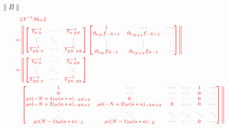 \documentclass[11pt,a4paper,titlepage]{jsreport}
\theoremstyle{definition}
\providecommand{\DIFdel}[1]{{\protect\color{red} \scriptsize #1}} %
\begin{document}
\begin{enumerate}
\item[\DIFdel{$\|B\|$}]%
\begin{displaymath}
  \DIFdel{\begin{split}
    &\|T^{-1}M_{01}\| \\
    =& \left \| \begin{bmatrix}
      T^{-1}_{0\ 0} & \cdots & T^{-1}_{0\ 2N} \\
      \vdots & \ddots & \vdots \\
      T^{-1}_{2N\ 0} & \cdots & T^{-1}_{2N\ 2N} \\
    \end{bmatrix}
    \begin{bmatrix}
      1 & \cdots & \cdots \\
      \partial_{a_N} f_{-N+1} & \partial_{a_{N+1}} f_{-N+1}  & \cdots \\
      \vdots & \vdots & \vdots \\
      \partial_{a_N} f_{N-1} & \partial_{a_{N+1}} f_{N-1}  & \cdots
    \end{bmatrix}\right\| \\
    =& \left\| \begin{bmatrix}
      T^{-1}_{0\ 0} & \cdots & T^{-1}_{0\ 2N} \\
      \vdots & \ddots & \vdots \\
      T^{-1}_{2N\ 0} & \cdots & T^{-1}_{2N\ 2N} \\
    \end{bmatrix}\right.\\
    &\left. \begin{bmatrix}
      1 & \cdots & \cdots  & \cdots & 1 & \cdots \\
      0 & \cdots & \cdots  & \cdots & 0 & \cdots \\
      \mu i (-N+1) \omega (a*a)_{-2N+2} & 0 & \cdots  & \cdots & 0 & \cdots\\
      \mu i (-N+2) \omega (a*a)_{-2N+1} & \mu i (-N+2) \omega (a*a)_{-2N+2} & 0 & \cdots & 0 & \cdots \\
      \vdots & \ddots & \ddots & \ddots & \ddots & \ddots \\
      \mu i (N-1) \omega (a*a)_{-1} & \mu i (N-1) \omega (a*a)_{-2}  & \cdots & \cdots & 0 & \cdots
    \end{bmatrix}\right\|\\
  \end{split}
}\end{displaymath}%

\end{enumerate}%
\end{document}
